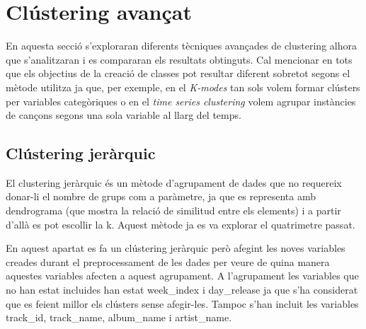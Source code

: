 \documentclass{article}
\begin{document}
\setcounter{page}{2}
\pagestyle{fancy}


\newpage

\section{Clústering avançat} 

En aquesta secció s'exploraran diferents tècniques avançades de clustering alhora que s'analitzaran i es compararan els resultats obtinguts. Cal mencionar en tots que els objectius de la creació de classes pot resultar diferent sobretot segons el mètode utilitza ja que, per exemple, en el \textit{K-modes} tan sols volem formar clústers per variables categòriques o en el \textit{time series clustering} volem agrupar instàncies de cançons segons una sola variable al llarg del temps.

\subsection{Clústering jeràrquic} \label{section:clustering_jerarquic}

El clustering jeràrquic és un mètode d'agrupament de dades que no requereix donar-li el nombre de grups com a paràmetre, ja que es representa amb dendrograma (que mostra la relació de similitud entre els elements) i a partir d'allà es pot escollir la k. Aquest mètode ja es va explorar el quatrimetre passat.

En aquest apartat es fa un clústering jeràrquic però afegint les noves variables creades durant el preprocessament de les dades per veure de quina manera aquestes variables afecten a aquest agrupament. A l'agrupament les variables que no han estat incluides han estat week\_index i day\_release ja que s'ha considerat que es feient millor els clústers sense afegir-les. Tampoc s'han incluit les variables track\_id, track\_name, album\_name i artist\_name. 
\end{document}
